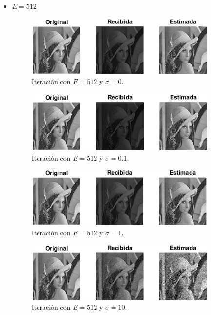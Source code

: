 \documentclass[a4paper]{article}
\begin{document}
\begin{itemize}
	\pagebreak
	\item $ E = 512 $
	\begin{figure}[H]
		\centering
		\includegraphics[width=0.9\textwidth]{E512S0.png}
		\caption{Iteración con $ E = 512 $ y $ \sigma = 0 $.}
	\end{figure}	
	\begin{figure}[H]
		\centering
		\includegraphics[width=0.9\textwidth]{E512S01.png}
		\caption{Iteración con $ E = 512 $ y $ \sigma = 0.1 $.}
	\end{figure}
	\begin{figure}[H]
		\centering	
		\includegraphics[width=0.9\textwidth]{E512S1.png}
		\caption{Iteración con $ E = 512 $ y $ \sigma = 1 $.}
	\end{figure}		
	\begin{figure}[H]
		\centering		
		\includegraphics[width=0.9\textwidth]{E512S10.png}
		\caption{Iteración con $ E = 512 $ y $ \sigma = 10 $.}

\end{figure}
\end{itemize}
\end{document}
